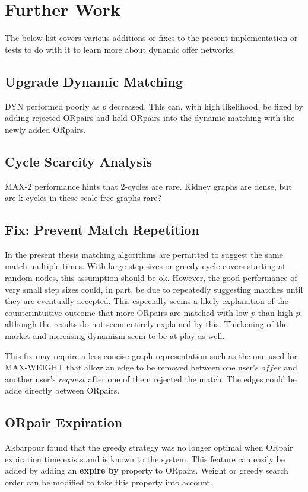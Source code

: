 \documentclass[main.tex]{subfiles}
\begin{document}
\section{Further Work}

The below list covers various additions or fixes to the present implementation or tests to do with it to learn more about dynamic offer networks.

\subsection{Upgrade Dynamic Matching}
DYN performed poorly as $p$ decreased. This can, with high likelihood, be fixed by adding rejected ORpairs and held ORpairs into the dynamic matching with the newly added ORpairs.

\subsection{Cycle Scarcity Analysis}
MAX-2 performance hints that 2-cycles are rare. Kidney graphs are dense, but are k-cycles in these scale free graphs rare?

\subsection{Fix: Prevent Match Repetition}
In the present thesis matching algorithms are permitted to suggest the same match multiple times. With large step-sizes or greedy cycle covers starting at random nodes, this assumption should be ok. However, the good performance of very small step sizes could, in part, be due to repeatedly suggesting matches until they are eventually accepted. This especially seems a likely explanation of the counterintuitive outcome that more ORpairs are matched with low $p$ than high $p$; although the results do not seem entirely explained by this. Thickening of the market and increasing dynamism seem to be at play as well.

This fix may require a less concise graph representation such as the one used for MAX-WEIGHT that allow an edge to be removed between one user's $offer$ and another user's $request$ after one of them rejected the match. The edges could be adde directly between ORpairs.

\subsection{ORpair Expiration}
Akbarpour \cite{Akb1} found that the greedy strategy was no longer optimal when ORpair expiration time exists and is known to the system. This feature can easily be added by adding an \textbf{expire by} property to ORpairs. Weight or greedy search order can be modified to take this property into account.
\end{document}

